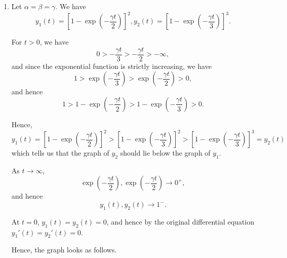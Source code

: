 \begin{enumerate}
    \item Let \(\alpha = \beta = \gamma\). We have
          \[
              y_1(t) = \left[1 - \exp\left(- \frac{\gamma t}{2}\right)\right]^2, y_2(t) = \left[1 - \exp\left(- \frac{\gamma t}{3}\right)\right]^3.
          \]

          For \(t > 0\), we have
          \[
              0 > -\frac{\gamma t}{3} > -\frac{\gamma t}{2} > -\infty,
          \]
          and since the exponential function is strictly increasing, we have
          \[
              1 > \exp\left(-\frac{\gamma t}{3}\right) > \exp\left(-\frac{\gamma t}{2}\right) > 0,
          \]
          and hence
          \[
              1 > 1 - \exp\left(-\frac{\gamma t}{2}\right) > 1 - \exp\left(-\frac{\gamma t}{3}\right) > 0.
          \]

          Hence,
          \[
              y_1(t) = \left[1 - \exp\left(-\frac{\gamma t}{2}\right)\right]^2 > \left[1 - \exp\left(-\frac{\gamma t}{3}\right)\right]^2 > \left[1 - \exp\left(-\frac{\gamma t}{3}\right)\right]^3 = y_2(t)
          \]
          which tells us that the graph of \(y_2\) should lie below the graph of \(y_1\).

          As \(t \to \infty\),
          \[
              \exp\left(-\frac{\gamma t}{2}\right), \exp\left(-\frac{\gamma t}{2}\right) \to 0^{+},
          \]
          and hence
          \[
              y_1(t), y_2(t) \to 1^{-}.
          \]

          At \(t = 0\), \(y_1(t) = y_2(t) = 0\), and hence by the original differential equation \(y_1'(t) = y_2'(t) = 0\).

          Hence, the graph looks as follows.

          \begin{center}
              
          \end{center}
\end{enumerate}